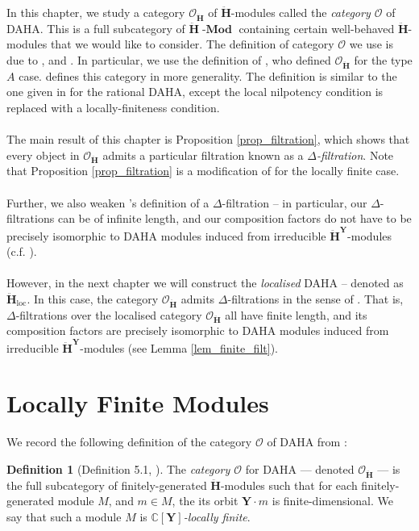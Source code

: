 \documentclass[a4paper]{report}
\theoremstyle{theorem}
\theoremstyle{definition}
\newtheorem{definition}{Definition}
\theoremstyle{remark}
\theoremstyle{proposition}
\theoremstyle{conjecture}
\theoremstyle{lemma}
\theoremstyle{corollary}
\theoremstyle{exercise}
\theoremstyle{example}
\newcommand{\C}{\mathbb{C}}
\newcommand{\mcal}{\mathcal}
\newcommand{\on}{\operatorname}
\newcommand{\lmod}{\on{\mathbf{-Mod}}}
\begin{document}
  In this chapter, we study a category $\mcal{O}_{\mathbf{\ddot{\mathbf{H}}}}$ of 
  $\mathbf{\ddot{\mathbf{H}}}$-modules called the \emph{category $\mcal{O}$} of DAHA. 
  This is a full subcategory of $\mathbf{\ddot{\mathbf{H}}}\lmod$ containing certain
  well-behaved $\mathbf{\ddot{\mathbf{H}}}$-modules that we would like to consider.
  The definition of category $\mcal{O}$ we use is due to \cite{che03}, and 
  \cite{jv19}. In particular, we use the definition of \cite{jv19}, who defined 
  $\mcal{O}_{\mathbf{\ddot{\mathbf{H}}}}$ for the type $A$ case. \cite{che03} defines this 
  category in more generality.
  The definition is similar to the one given in \cite{ggor03}
  for the rational DAHA, except the local nilpotency condition is replaced
  with a locally-finiteness condition. \\\\
  The main result of this chapter is Proposition \ref{prop_filtration}, which 
  shows that every object in $\mcal{O}_{\mathbf{\ddot{\mathbf{H}}}}$ admits a particular 
  filtration known as a \emph{$\Delta$-filtration}. 
  Note that Proposition \ref{prop_filtration} is a modification of 
  \cite[Proposition 2.2]{ggor03} for the locally finite case. \\\\
  Further, we also weaken \cite{ggor03}'s definition of a $\Delta$-filtration --
  in particular, our $\Delta$-filtrations can be of infinite length, and our 
  composition
  factors do not have to be precisely isomorphic to DAHA modules induced from 
  irreducible $\mathbf{\ddot{\mathbf{H}}}^{\mathbf{Y}}$-modules (c.f. \cite[Definition 2.3.3]{ggor03}). \\\\
  However, in the next chapter we will construct the \emph{localised} DAHA --
  denoted as $\mathbf{\ddot{\mathbf{H}}}_{\on{loc}}$. In this case, the category 
  $\mcal{O}_{\mathbf{\ddot{\mathbf{H}}}}$ admits $\Delta$-filtrations in 
  the sense of \cite{ggor03}.
  That is, $\Delta$-filtrations over the localised category 
  $\mcal{O}_{\mathbf{\ddot{\mathbf{H}}}}$ all have finite length, and its composition 
  factors are precisely isomorphic to DAHA modules induced from irreducible 
  $\mathbf{\ddot{\mathbf{H}}}^{\mathbf{Y}}$-modules (see Lemma \ref{lem_finite_filt}).
  
  \section{Locally Finite Modules}
  We record the following definition of the category $\mcal{O}$ of 
  DAHA from \cite{jv19}:
  \begin{definition}[Definition 5.1, \cite{jv19}]
      The \emph{category $\mcal{O}$} for DAHA --- denoted $\mcal{O}_{\mathbf{\ddot{\mathbf{H}}}}$ --- is the full subcategory of finitely-generated 
      $\mathbf{\ddot{\mathbf{H}}}$-modules such that for each finitely-generated module 
      $M$, and $m\in M$, the its orbit $\mathbf{Y}\cdot m$ is finite-dimensional.
      We say that such a module $M$ is \emph{$\C[\mathbf{Y}]$-locally finite}.
  \end{definition}
  
\end{document}
